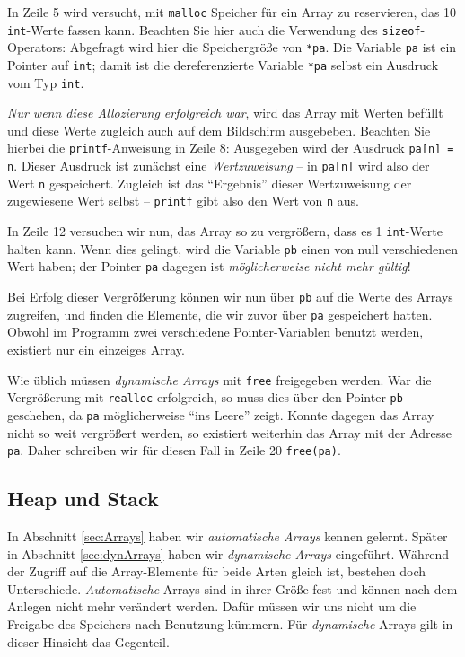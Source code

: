 In Zeile 5 wird versucht, mit \texttt{malloc} Speicher für ein Array zu reservieren, das 10 \texttt{int}-Werte fassen kann. Beachten Sie hier auch die Verwendung des \texttt{sizeof}-Operators: Abgefragt wird hier die Speichergröße von \texttt{*pa}. Die Variable \texttt{pa} ist ein Pointer auf \texttt{int}; damit ist die dereferenzierte Variable \texttt{*pa} selbst ein Ausdruck vom Typ \texttt{int}.

\emph{Nur wenn diese Allozierung erfolgreich war}, wird das Array mit Werten befüllt und diese Werte zugleich auch auf dem Bildschirm ausgebeben. Beachten Sie hierbei die \texttt{printf}-Anweisung in Zeile 8: Ausgegeben wird der Ausdruck \texttt{pa[n] = n}. Dieser Ausdruck ist zunächst eine \emph{Wertzuweisung} -- in \texttt{pa[n]} wird also der Wert \texttt{n} gespeichert. Zugleich ist das \enquote{Ergebnis} dieser Wertzuweisung der zugewiesene Wert selbst -- \texttt{printf} gibt also den Wert von \texttt{n} aus.

In Zeile 12 versuchen wir nun, das Array so zu vergrößern, dass es \mbox{1} \texttt{int}-Werte halten kann. Wenn dies gelingt, wird die Variable \texttt{pb} einen von null verschiedenen Wert haben; der Pointer \texttt{pa} dagegen ist \emph{möglicherweise nicht mehr gültig}!

Bei Erfolg dieser Vergrößerung können wir nun über \texttt{pb} auf die Werte des Arrays zugreifen, und finden die Elemente, die wir zuvor über \texttt{pa} gespeichert hatten. Obwohl im Programm zwei verschiedene Pointer-Variablen benutzt werden, existiert nur ein einzeiges Array.

Wie üblich müssen \emph{dynamische Arrays} mit \texttt{free} freigegeben werden. War die Vergrößerung mit \texttt{realloc} erfolgreich, so muss dies über den Pointer \texttt{pb} geschehen, da \texttt{pa} möglicherweise \enquote{ins Leere} zeigt. Konnte dagegen das Array nicht so weit vergrößert werden, so existiert weiterhin das Array mit der Adresse \texttt{pa}. Daher schreiben wir für diesen Fall in Zeile 20 \texttt{free(pa)}.

\subsection{Heap und Stack} \label{sec:HeapStack}
In Abschnitt \ref{sec:Arrays} haben wir \emph{automatische Arrays} kennen gelernt. Später in Abschnitt \ref{sec:dynArrays} haben wir \emph{dynamische Arrays} eingeführt. Während der Zugriff auf die Array-Elemente für beide Arten gleich ist, bestehen doch Unterschiede. \emph{Automatische} Arrays sind in ihrer Größe fest und können nach dem Anlegen nicht mehr verändert werden. Dafür müssen wir uns nicht um die Freigabe des Speichers nach Benutzung kümmern. Für \emph{dynamische} Arrays gilt in dieser Hinsicht das Gegenteil.

